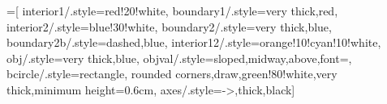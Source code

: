 \newcommand{\vtd}[4]{
\left[
\begin{array}{c}
#1 \\
#2 \\
#3 \\
#4
\end{array}
\right]}

\newcommand{\vdn}[3]{
\vect{#1}=\left[
\begin{array}{c}
#2 \\
#3 
\end{array}
\right]}

\newcommand{\vdu}[2]{
\left[
\begin{array}{c}
#1 \\
#2 
\end{array}
\right]}

\newcommand{\stlb}[3]{
\left\{\begin{matrix}
#1 \\ #2 \\ #3
\end{matrix}\right.}

\newcommand{\stlt}[3]{
\left\{\begin{matrix}
#1 \\ #2 \\ #3
\end{matrix}\right.}

\newcommand{\brows}[1]{%
  \begin{bmatrix}
  \begin{array}{@{\protect\rotvert\;}c@{\;\protect\rotvert}}
  #1
  \end{array}
  \end{bmatrix}
}
\newcommand{\rotvert}{\rotatebox[origin=c]{90}{$\vert$}}
\newcommand{\rowsvdots}{\multicolumn{1}{@{}c@{}}{\vdots}}

\usepackage{tikz,ifthen,calc}
\usetikzlibrary{shapes,arrows,shadows,trees,patterns}
\usetikzlibrary{positioning,calc,fit,backgrounds}
\usetikzlibrary{fadings}
\tikzfading[name=fade out, inner color=transparent!0, outer color=transparent!100]

=[
			interior1/.style={red!20!white},
			boundary1/.style={very thick,red},
			interior2/.style={blue!30!white},
			boundary2/.style={very thick,blue},
			boundary2b/.style={dashed,blue},
			interior12/.style={orange!10!cyan!10!white},
			obj/.style={very thick,blue},
			objval/.style={sloped,midway,above,font=\footnotesize},
			bcircle/.style={rectangle, rounded corners,draw,green!80!white,very thick,minimum height=0.6cm},
			axes/.style={->,thick,black}]
\usetikzlibrary{decorations.pathreplacing,decorations.pathmorphing,decorations.markings,matrix}

